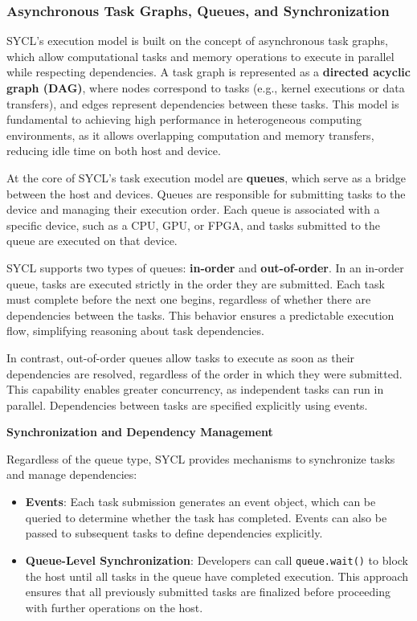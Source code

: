 \subsubsection{Asynchronous Task Graphs, Queues, and Synchronization}

SYCL’s execution model is built on the concept of asynchronous task graphs, which allow computational tasks and memory operations to
execute in parallel while respecting dependencies. A task graph is represented as a \textbf{directed acyclic graph (DAG)}, where
nodes correspond to tasks (e.g., kernel executions or data transfers), and edges represent dependencies between these tasks. This
model is fundamental to achieving high performance in heterogeneous computing environments, as it allows overlapping computation and
memory transfers, reducing idle time on both host and device.

At the core of SYCL’s task execution model are \textbf{queues}, which serve as a bridge between the host and devices. Queues are
responsible for submitting tasks to the device and managing their execution order. Each queue is associated with a specific device,
such as a CPU, GPU, or FPGA, and tasks submitted to the queue are executed on that device.

SYCL supports two types of queues: \textbf{in-order} and \textbf{out-of-order}. In an in-order queue, tasks are executed strictly in
the order they are submitted. Each task must complete before the next one begins, regardless of whether there are dependencies between
the tasks. This behavior ensures a predictable execution flow, simplifying reasoning about task dependencies.

In contrast, out-of-order queues allow tasks to execute as soon as their dependencies are resolved, regardless of the order in which
they were submitted. This capability enables greater concurrency, as independent tasks can run in parallel. Dependencies between
tasks are specified explicitly using events. \cite{SYCL2020}

\textbf{Synchronization and Dependency Management}

Regardless of the queue type, SYCL provides mechanisms to synchronize tasks and manage dependencies:
\begin{itemize}
    \item \textbf{Events}: Each task submission generates an event object, which can be queried to determine whether the task has
    completed. Events can also be passed to subsequent tasks to define dependencies explicitly.
    \item \textbf{Queue-Level Synchronization}: Developers can call \texttt{queue.wait()} to block the host until all tasks in the
    queue have completed execution. This approach ensures that all previously submitted tasks are finalized before proceeding with
    further operations on the host.
\end{itemize}
\cite{SYCL2020}

